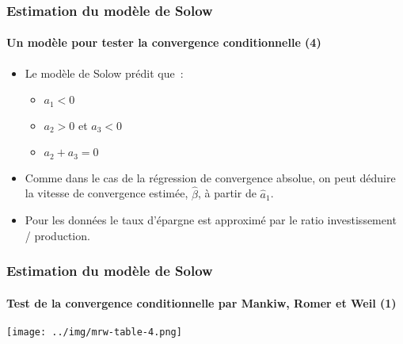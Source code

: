 \documentclass[10pt,notheorems]{beamer}
\theoremstyle{plain}
\theoremstyle{definition} %
\begin{document}
\begin{frame}
  \frametitle{Estimation du modèle de Solow}
  \framesubtitle{Un modèle pour tester la convergence conditionnelle (4)}

  \begin{itemize}

  \item Le modèle de Solow prédit que~:\newline

    \begin{itemize}

    \item $a_1<0$

    \item $a_2>0$ et $a_3<0$

    \item $a_2+a_3 = 0$\newline

    \end{itemize}

  \item Comme dans le cas de la régression de convergence absolue, on peut déduire la vitesse de convergence estimée, $\hat\beta$, à partir de $\hat a_1$.\newline

  \item Pour les données le taux d'épargne est approximé par le ratio investissement / production.

  \end{itemize}

\end{frame}


\begin{frame}
  \frametitle{Estimation du modèle de Solow}
  \framesubtitle{Test de la convergence conditionnelle par Mankiw, Romer et Weil (1)}

  \begin{center}
    \texttt{[image: ../img/mrw-table-4.png]}
  \end{center}

\end{frame}
\end{document}
